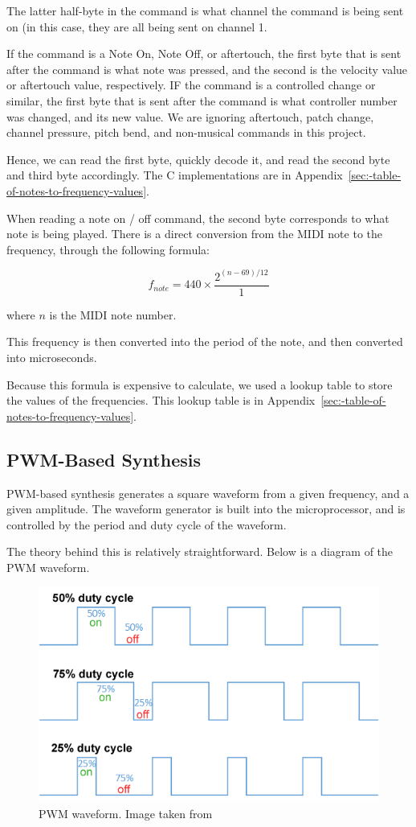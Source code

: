 The latter half-byte in the command is what channel the command is being sent on (in this case, they are all being sent on channel 1. 

If the command is a Note On, Note Off, or aftertouch, the first byte that is sent after the command is what note was pressed, and the second is the velocity value or aftertouch value, respectively. IF the command is a controlled change or similar, the first byte that is sent after the command is what controller number was changed, and its new value. We are ignoring aftertouch, patch change, channel pressure, pitch bend, and non-musical commands in this project. 

Hence, we can read the first byte, quickly decode it, and read the second byte and third byte accordingly.
The C implementations are in Appendix~\ref{sec:-table-of-notes-to-frequency-values}.

When reading a note on / off command, the second byte corresponds to what note is being played.
There is a direct conversion from the MIDI note to the frequency, through the following formula:

\[
f_{note}=440\times\frac{2^{(n-69)/12}}{1}
\]

where $n$ is the MIDI note number.

This frequency is then converted into the period of the note, and then converted into microseconds.

Because this formula is expensive to calculate, we used a lookup table to store the values of the frequencies.
This lookup table is in Appendix~\ref{sec:-table-of-notes-to-frequency-values}.

\subsection{PWM-Based Synthesis}\label{subsec:pwm-based-synthesis-theory}

PWM-based synthesis generates a square waveform from a given frequency, and a given amplitude.
The waveform generator is built into the microprocessor, and is controlled by the period and duty cycle of the waveform.

The theory behind this is relatively straightforward.
Below is a diagram of the PWM waveform.

\begin{figure}[H]
    \centering
    \includegraphics[width = 0.5 \textwidth]{pwmwaveform}
    \caption{PWM waveform. Image taken from} %
    \label{fig:pwmwaveform}
\end{figure}

